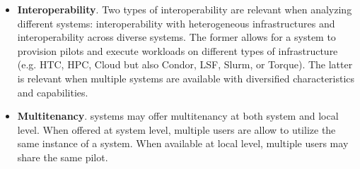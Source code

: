 \documentclass{sig-alternate}
\begin{document}
\begin{itemize}
\item \textbf{Interoperability}. Two types of interoperability are
  relevant when analyzing different \pilot systems: interoperability with
  heterogeneous infrastructures and interoperability across diverse
  \pilot systems. The former allows for a \pilot system to provision pilots
  and execute workloads on different types of infrastructure (e.g. HTC, HPC,
  Cloud but also Condor, LSF, Slurm, or Torque). The latter is relevant when
  multiple \pilot systems are available with diversified characteristics and
  capabilities.




\item \textbf{Multitenancy}. \pilot systems may offer multitenancy at both
  system and local level. When offered at system level, multiple users are
  allow to utilize the same instance of a \pilot system. When available at
  local level, multiple users may share the same pilot.



\end{itemize}
\end{document}
